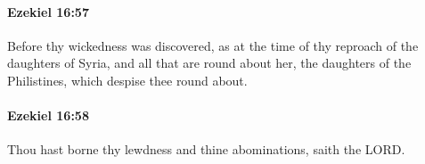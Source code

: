 		\paragraph{Ezekiel 16:57} %
			\label{EZEKIEL-16-57}

			Before thy wickedness was discovered, as at the time of thy reproach of the daughters of Syria, and all that are round about her, the daughters of the Philistines, which despise thee round about.


		\paragraph{Ezekiel 16:58} %
			\label{EZEKIEL-16-58}

			Thou hast borne thy lewdness and thine abominations, saith the LORD.


